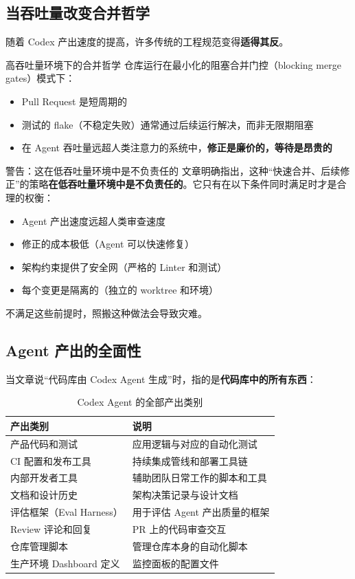 \documentclass[a4paper]{article}
\begin{document}
\subsection{当吞吐量改变合并哲学}

随着 Codex 产出速度的提高，许多传统的工程规范变得\textbf{适得其反}。

\begin{importantbox}{高吞吐量环境下的合并哲学}
仓库运行在最小化的阻塞合并门控（blocking merge gates）模式下：
\begin{itemize}[nosep]
  \item Pull Request 是短周期的
  \item 测试的 flake（不稳定失败）通常通过后续运行解决，而非无限期阻塞
  \item 在 Agent 吞吐量远超人类注意力的系统中，\textbf{修正是廉价的，等待是昂贵的}
\end{itemize}
\end{importantbox}

\begin{warningbox}{警告：这在低吞吐量环境中是不负责任的}
文章明确指出，这种``快速合并、后续修正''的策略\textbf{在低吞吐量环境中是不负责任的}。它只有在以下条件同时满足时才是合理的权衡：
\begin{itemize}[nosep]
  \item Agent 产出速度远超人类审查速度
  \item 修正的成本极低（Agent 可以快速修复）
  \item 架构约束提供了安全网（严格的 Linter 和测试）
  \item 每个变更是隔离的（独立的 worktree 和环境）
\end{itemize}
不满足这些前提时，照搬这种做法会导致灾难。
\end{warningbox}

\subsection{Agent 产出的全面性}

当文章说``代码库由 Codex Agent 生成''时，指的是\textbf{代码库中的所有东西}：

\begin{table}[H]
\centering
\begin{tabular}{ll}
\toprule
\textbf{产出类别} & \textbf{说明} \\
\midrule
产品代码和测试 & 应用逻辑与对应的自动化测试 \\
CI 配置和发布工具 & 持续集成管线和部署工具链 \\
内部开发者工具 & 辅助团队日常工作的脚本和工具 \\
文档和设计历史 & 架构决策记录与设计文档 \\
评估框架（Eval Harness） & 用于评估 Agent 产出质量的框架 \\
Review 评论和回复 & PR 上的代码审查交互 \\
仓库管理脚本 & 管理仓库本身的自动化脚本 \\
生产环境 Dashboard 定义 & 监控面板的配置文件 \\
\bottomrule
\end{tabular}
\caption{Codex Agent 的全部产出类别}
\end{table}
\end{document}
